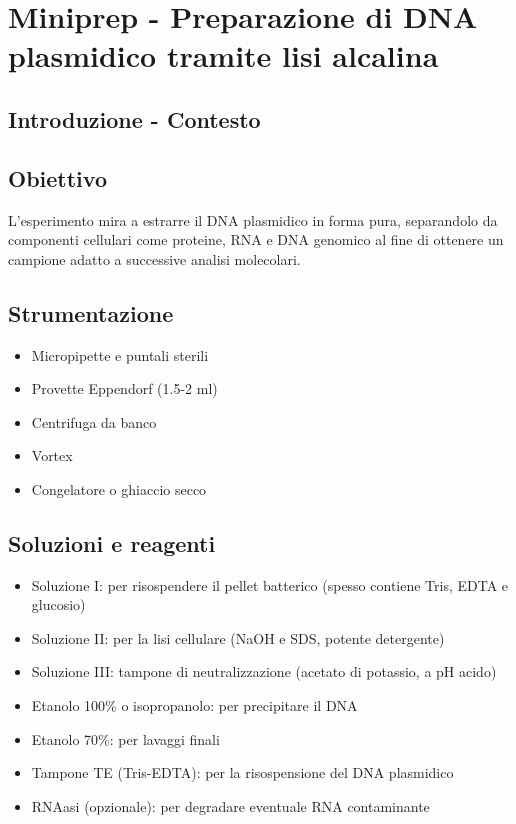 \section {Miniprep - Preparazione di DNA plasmidico tramite lisi alcalina}

\subsection{Introduzione - Contesto}


\subsection{Obiettivo}
L’esperimento mira a estrarre il DNA plasmidico in forma pura, separandolo da componenti cellulari come proteine, RNA e DNA genomico al fine di ottenere un campione adatto a successive analisi molecolari.

\subsection{Strumentazione}
\begin{itemize}
	\item Micropipette e puntali sterili
	\item Provette Eppendorf (1.5-2 ml)
	\item Centrifuga da banco
	\item Vortex
	\item Congelatore o ghiaccio secco
\end{itemize}

\subsection{Soluzioni e reagenti}
\begin{itemize}
	\item {Soluzione I}: per risospendere il pellet batterico (spesso contiene Tris, EDTA e glucosio)
	\item {Soluzione II}: per la lisi cellulare (NaOH e SDS, potente detergente)
	\item {Soluzione III}: tampone di neutralizzazione (acetato di potassio, a pH acido)
	\item {Etanolo 100\% o isopropanolo}: per precipitare il DNA
	\item {Etanolo 70\%}: per lavaggi finali
	\item {Tampone TE (Tris-EDTA)}: per la risospensione del DNA plasmidico
	\item {RNAasi (opzionale)}: per degradare eventuale RNA contaminante
\end{itemize}


